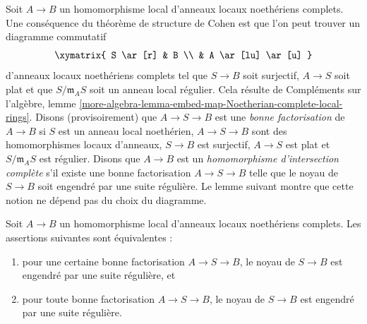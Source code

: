\noindent
Soit $A \to B$ un homomorphisme local d'anneaux locaux noethériens complets. Une
conséquence du théorème de structure de Cohen est que l'on peut trouver un
diagramme commutatif
$$
\xymatrix{
S \ar[r] & B \\
& A \ar[lu] \ar[u]
}
$$
d'anneaux locaux noethériens complets tel que
$S \to B$ soit surjectif, $A \to S$ soit plat et que
$S/\mathfrak m_A S$ soit un anneau local régulier. Cela résulte de
Compléments sur l'algèbre, lemme
\ref{more-algebra-lemma-embed-map-Noetherian-complete-local-rings}.
Disons (provisoirement) que $A \to S \to B$ est une {\it bonne factorisation}
de $A \to B$ si $S$ est un anneau local noethérien,
$A \to S \to B$ sont des homomorphismes locaux d'anneaux,
$S \to B$ est surjectif, $A \to S$ est plat et $S/\mathfrak m_AS$ est
régulier. Disons que $A \to B$ est un
{\it homomorphisme d'intersection
complète} s'il existe une bonne factorisation $A \to S \to B$
telle que le noyau de $S \to B$ soit engendré par une suite
régulière. Le lemme suivant montre que cette notion ne dépend
pas du choix du diagramme.

\begin{lemma}
\label{lemma-ci-map-well-defined}
Soit $A \to B$ un homomorphisme local d'anneaux locaux noethériens complets. Les
assertions suivantes sont équivalentes :
\begin{enumerate}
\item pour une certaine bonne factorisation $A \to S \to B$, le noyau de
$S \to B$ est engendré par une suite régulière, et
\item pour toute bonne factorisation $A \to S \to B$, le noyau de
$S \to B$ est engendré par une suite régulière.
\end{enumerate}
\end{lemma}

